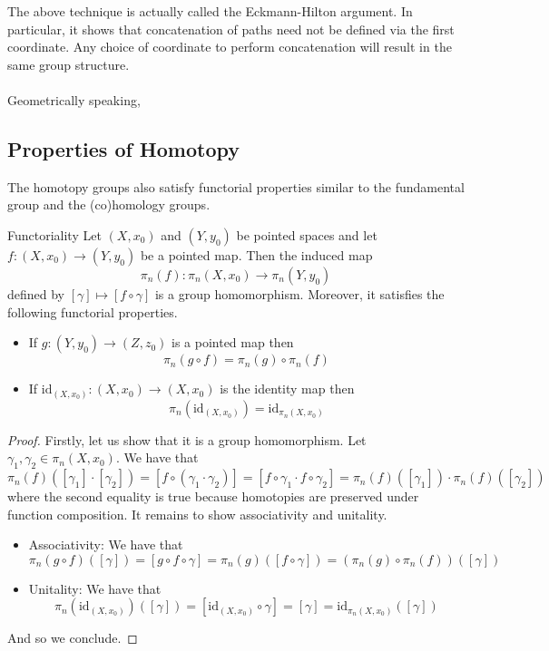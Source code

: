 \documentclass[a4paper]{article}
\begin{document}
The above technique is actually called the Eckmann-Hilton argument. In particular, it shows that concatenation of paths need not be defined via the first coordinate. Any choice of coordinate to perform concatenation will result in the same group structure. \\~\\

Geometrically speaking, 

\subsection{Properties of Homotopy}
The homotopy groups also satisfy functorial properties similar to the fundamental group and the (co)homology groups. 

\begin{thm}{Functoriality}{} Let $(X,x_0)$ and $(Y,y_0)$ be pointed spaces and let $f:(X,x_0)\to(Y,y_0)$ be a pointed map. Then the induced map $$\pi_n(f):\pi_n(X,x_0)\to\pi_n(Y,y_0)$$ defined by $[\gamma]\mapsto[f\circ\gamma]$ is a group homomorphism. Moreover, it satisfies the following functorial properties. 
\begin{itemize}
\item If $g:(Y,y_0)\to(Z,z_0)$ is a pointed map then $$\pi_n(g\circ f)=\pi_n(g)\circ\pi_n(f)$$
\item If $\text{id}_{(X,x_0)}:(X,x_0)\to(X,x_0)$ is the identity map then $$\pi_n(\text{id}_{(X,x_0)})=\text{id}_{\pi_n(X,x_0)}$$
\end{itemize} \tcbline
\begin{proof}
Firstly, let us show that it is a group homomorphism. Let $\gamma_1,\gamma_2\in\pi_n(X,x_0)$. We have that $$\pi_n(f)([\gamma_1]\cdot[\gamma_2])=[f\circ(\gamma_1\cdot\gamma_2)]=[f\circ\gamma_1\cdot f\circ\gamma_2]=\pi_n(f)([\gamma_1])\cdot\pi_n(f)([\gamma_2])$$ where the second equality is true because homotopies are preserved under function composition. It remains to show associativity and unitality. 
\begin{itemize}
\item Associativity: We have that $$\pi_n(g\circ f)([\gamma])=[g\circ f\circ\gamma]=\pi_n(g)([f\circ\gamma])=(\pi_n(g)\circ\pi_n(f))([\gamma])$$
\item Unitality: We have that $$\pi_n(\text{id}_{(X,x_0)})([\gamma])=[\text{id}_{(X,x_0)}\circ\gamma]=[\gamma]=\text{id}_{\pi_n(X,x_0)}([\gamma])$$
\end{itemize}
And so we conclude. 
\end{proof}
\end{thm}
\end{document}
